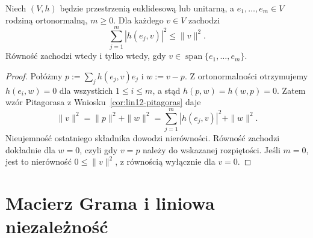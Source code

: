 \begin{stwierdzenie}
\label{prop:lin12-bessel}
Niech \((V,h)\) będzie przestrzenią
euklidesową lub unitarną,
a \(e_1,\ldots,e_m\in V\)
rodziną ortonormalną, \(m\ge0\).
Dla każdego \(v\in V\)
zachodzi
\[
 \sum_{j=1}^{m}|h(e_j,v)|^2\le\|v\|^2.
\]
Równość zachodzi wtedy i tylko wtedy,
gdy \(v\in\operatorname{span}
\{e_1,\ldots,e_m\}\).
\end{stwierdzenie}
\begin{proof}
Połóżmy
\(p:=\sum_jh(e_j,v)e_j\)
i \(w:=v-p\).
Z ortonormalności otrzymujemy
\(h(e_i,w)=0\) dla wszystkich
\(1\le i\le m\), a stąd
\(h(p,w)=h(w,p)=0\).
Zatem wzór Pitagorasa z
Wniosku~\ref{cor:lin12-pitagoras}
daje
\[
 \|v\|^2=\|p\|^2+\|w\|^2
 =\sum_{j=1}^m|h(e_j,v)|^2+\|w\|^2.
\]
Nieujemność ostatniego składnika
dowodzi nierówności.
Równość zachodzi dokładnie
dla \(w=0\), czyli gdy
\(v=p\) należy do wskazanej
rozpiętości. Jeśli \(m=0\),
jest to nierówność
\(0\le\|v\|^2\), z równością
wyłącznie dla \(v=0\).
\end{proof}

\section{Macierz Grama i liniowa niezależność}
\label{sec:lin12-gram-determinant}

